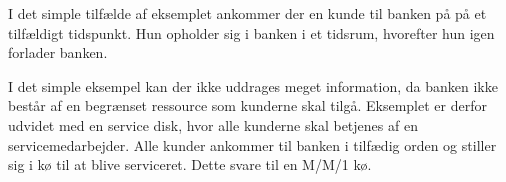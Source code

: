 I det simple tilfælde af eksemplet ankommer der en kunde til banken på på et 
tilfældigt tidspunkt. Hun opholder sig i banken i et tidsrum, hvorefter hun 
igen forlader banken.

I det simple eksempel kan der ikke uddrages meget information, da banken ikke 
består af en begrænset ressource som kunderne skal tilgå.  Eksemplet er derfor 
udvidet med en service disk, hvor alle kunderne skal betjenes af en 
servicemedarbejder. Alle kunder ankommer til banken i tilfædig orden og 
stiller sig i kø til at blive serviceret. Dette  svare til en M/M/1 kø.
